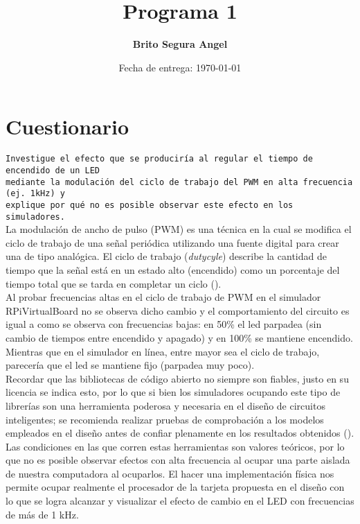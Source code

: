 \documentclass[letterpaper,11.5pt]{article} %
\title{Programa 1}
\author{\textbf{Brito Segura Angel}}
\date{Fecha de entrega: \today}
\begin{document}
    \maketitle %
    
    \pagestyle{empty} %
    \maketitle
    \thispagestyle{empty}
    
    \section{Cuestionario}
    \texttt{Investigue el efecto que se produciría al regular el tiempo de encendido de un LED\\mediante la modulación del ciclo de trabajo del PWM en alta frecuencia (ej. 1kHz) y\\explique por qué no es posible observar este efecto en los simuladores.}\\[1.5em]    
    La modulación de ancho de pulso (PWM) es una técnica en la cual se modifica el ciclo de trabajo de una señal periódica utilizando una fuente digital para crear una de tipo analógica. El ciclo de trabajo (\textit{dutycyle}) describe la cantidad de tiempo que la señal está en un estado alto (encendido) como un porcentaje del tiempo total que se tarda en completar un ciclo (\cite{tinkercard}).\\

    Al probar frecuencias altas en el ciclo de trabajo de PWM en el simulador RPiVirtualBoard no se observa dicho cambio y el comportamiento del circuito es igual a como se observa con frecuencias bajas: en 50\% el led parpadea (sin cambio de tiempos entre encendido y apagado) y en 100\% se mantiene encendido. Mientras que en el simulador en línea, entre mayor sea el ciclo de trabajo, parecería que el led se mantiene fijo (parpadea muy poco).\\
    
    Recordar que las bibliotecas de código abierto no siempre son fiables, justo en su licencia se indica esto, por lo que si bien los simuladores ocupando este tipo de librerías son una herramienta poderosa y necesaria en el diseño de circuitos inteligentes; se recomienda realizar pruebas de comprobación a los modelos empleados en el diseño antes de confiar plenamente en los resultados obtenidos (\cite{arduino}). Las condiciones en las que corren estas herramientas son valores teóricos, por lo que no es posible observar efectos con alta frecuencia al ocupar una parte aislada de nuestra computadora al ocuparlos. El hacer una implementación física nos permite ocupar realmente el procesador de la tarjeta propuesta en el diseño con lo que se logra alcanzar y visualizar el efecto de cambio en el LED con frecuencias de más de 1 kHz.\newline
    
    \printbibliography %
\end{document}
